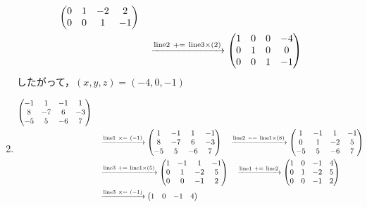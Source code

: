 \documentclass{ltjsarticle}
\begin{document}
\begin{enumerate}
\begin{align*}
\begin{pmatrix}
 0 & 1 & - 2 & 2\\
 0 & 0 & 1 & -1
\end{pmatrix}\allowdisplaybreaks\\
 &\ \ \ \xrightarrow{ \text{line} 2 \ +=\  \text{line} 3 \times\left( 2 \right)} %
\begin{pmatrix}
 1 & 0 & 0 & - 4\\
 0 & 1 & 0 & 0\\
 0 & 0 & 1 & -1
\end{pmatrix}
\end{align*}
したがって，$(x, y, z)=(-4, 0, -1)$
\item
\begin{align*}
 \begin{pmatrix}
 -1 & 1 & -1 & 1\\
 8 & - 7 & 6 & - 3\\
 - 5 & 5 & - 6 & 7
\end{pmatrix}\allowdisplaybreaks\\
&\ \ \ \xrightarrow{ \text{line} 1 \ \times=\ \left( - 1 \right)} %
\begin{pmatrix}
 1 & -1 & 1 & -1\\
 8 & - 7 & 6 & - 3\\
 - 5 & 5 & - 6 & 7
\end{pmatrix}\ \ \ \xrightarrow{ \text{line} 2 \ -=\  \text{line} 1 \times\left( 8 \right)} %
\begin{pmatrix}
 1 & -1 & 1 & -1\\
 0 & 1 & - 2 & 5\\
 - 5 & 5 & - 6 & 7
\end{pmatrix}\allowdisplaybreaks\\
&\ \ \ \xrightarrow{ \text{line} 3 \ +=\  \text{line} 1 \times\left( 5 \right)} %
\begin{pmatrix}
 1 & -1 & 1 & -1\\
 0 & 1 & - 2 & 5\\
 0 & 0 & -1 & 2
\end{pmatrix}\ \ \ \xrightarrow{ \text{line} 1 \ +=\  \text{line} 2 } %
\begin{pmatrix}
 1 & 0 & -1 & 4\\
 0 & 1 & - 2 & 5\\
 0 & 0 & -1 & 2
\end{pmatrix}\allowdisplaybreaks\\
&\ \ \ \xrightarrow{ \text{line} 3 \ \times=\ \left( - 1 \right)} %
\begin{pmatrix}
 1 & 0 & -1 & 4\\

\end{pmatrix}
\end{align*}
\end{enumerate}
\end{document}
